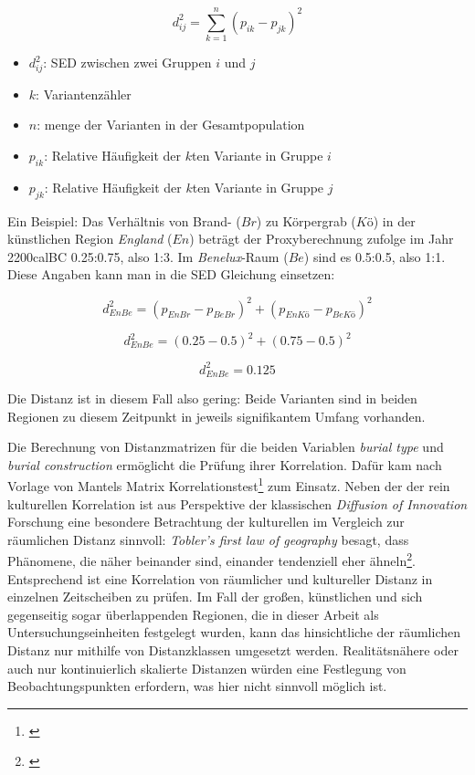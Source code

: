 \documentclass[openany,twoside,twocolumn]{book}
\providecommand{\tightlist}{%
  \setlength{\itemsep}{0pt}\setlength{\parskip}{0pt}}
\let\rmarkdownfootnote\footnote%
\def\footnote{\protect\rmarkdownfootnote}
\begin{document}
\[d_{ij}^2 = \sum_{k = 1}^{n} (p_{ik} - p_{jk})^2\]

\begin{itemize}
\tightlist
\item
  \(d_{ij}^2\): SED zwischen zwei Gruppen \(i\) und \(j\)
\item
  \(k\): Variantenzähler
\item
  \(n\): menge der Varianten in der Gesamtpopulation
\item
  \(p_{ik}\): Relative Häufigkeit der \(k\)ten Variante in Gruppe \(i\)
\item
  \(p_{jk}\): Relative Häufigkeit der \(k\)ten Variante in Gruppe \(j\)
\end{itemize}

Ein Beispiel: Das Verhältnis von Brand- (\(Br\)) zu Körpergrab (\(Kö\))
in der künstlichen Region \emph{England} (\(En\)) beträgt der
Proxyberechnung zufolge im Jahr 2200calBC 0.25:0.75, also 1:3. Im
\emph{Benelux}-Raum (\(Be\)) sind es 0.5:0.5, also 1:1. Diese Angaben
kann man in die SED Gleichung einsetzen:

\[d_{En Be}^2 = (p_{En Br} - p_{Be Br})^2 + (p_{En Kö} - p_{Be Kö})^2\]

\[d_{En Be}^2 = (0.25 - 0.5)^2 + (0.75 - 0.5)^2\]

\[d_{En Be}^2 = 0.125\]

Die Distanz ist in diesem Fall also gering: Beide Varianten sind in
beiden Regionen zu diesem Zeitpunkt in jeweils signifikantem Umfang
vorhanden.

Die Berechnung von Distanzmatrizen für die beiden Variablen \emph{burial
type} und \emph{burial construction} ermöglicht die Prüfung ihrer
Korrelation. Dafür kam nach Vorlage von
\textcite{porcic_simulating_2014} Mantels Matrix
Korrelationstest\footnote{\textcite{mantel_detection_1967}} zum Einsatz.
Neben der der rein kulturellen Korrelation ist aus Perspektive der
klassischen \emph{Diffusion of Innovation} Forschung eine besondere
Betrachtung der kulturellen im Vergleich zur räumlichen Distanz
sinnvoll: \emph{Tobler's first law of geography} besagt, dass Phänomene,
die näher beinander sind, einander tendenziell eher ähneln\footnote{\textcite{tobler_computer_1970}}.
Entsprechend ist eine Korrelation von räumlicher und kultureller Distanz
in einzelnen Zeitscheiben zu prüfen. Im Fall der großen, künstlichen und
sich gegenseitig sogar überlappenden Regionen, die in dieser Arbeit als
Untersuchungseinheiten festgelegt wurden, kann das hinsichtliche der
räumlichen Distanz nur mithilfe von Distanzklassen umgesetzt werden.
Realitätsnähere oder auch nur kontinuierlich skalierte Distanzen würden
eine Festlegung von Beobachtungspunkten erfordern, was hier nicht
sinnvoll möglich ist.
\end{document}
